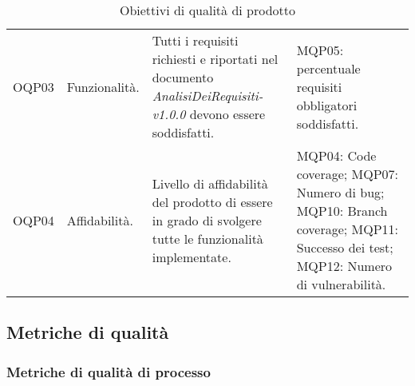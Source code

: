 \begin{table}[H]
\begin{tabular}{ m{}<{\centering}  m{}<{\centering}  m{}<{\centering}  m{}<{\centering} }
		\rowcolor{gray!25}        
        OQP03 &
        Funzionalità. &
        Tutti i requisiti richiesti e riportati nel documento \textit{AnalisiDeiRequisiti-v1.0.0} devono essere soddisfatti. &
        MQP05: percentuale requisiti obbligatori soddisfatti. \\

		\rowcolor{gray!00}
        OQP04 &
        Affidabilità. &
        Livello di affidabilità del prodotto di essere in grado di svolgere tutte le funzionalità implementate. &
        MQP04: Code coverage; \newline
        MQP07: Numero di bug; \newline
        MQP10: Branch coverage; \newline
        MQP11: Successo dei test; \newline
        MQP12: Numero di vulnerabilità. \\

    \end{tabular}
    \caption{Obiettivi di qualità di prodotto}
\end{table}

\subsection{Metriche di qualità}

\subsubsection{Metriche di qualità di processo}

